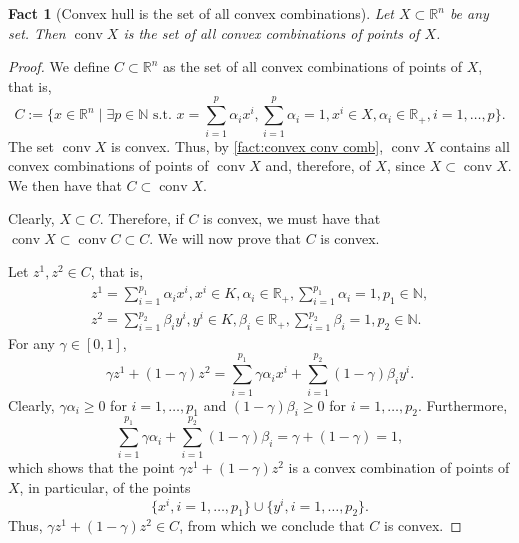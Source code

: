 \documentclass[smallextended,numbook,nospthms]{svjour3}
\theoremstyle{plain}
\newtheorem{fact}[theorem]{Fact}
\theoremstyle{definition}
\def\RR{\mathds R}
\def\NN{\mathds N}
\begin{document}
\begin{fact}[Convex hull is the set of all convex combinations]\label{fact:conv hull conv comb}
	Let $X \subset \RR^n$ be any set. Then $\operatorname{conv} X$ is the set of all convex combinations of points of $X$.
\end{fact}
\begin{proof}
	We define $C \subset \RR^n$ as the set of all convex combinations of points of $X$, that is,
	\[
	C:=\{x \in \RR^n \mid \exists p \in \NN \text{ s.t. } x=\sum_{i=1}^{p}\alpha_{i}x^{i}, \sum_{i=1}^{p} \alpha_{i}=1, x^{i} \in X, \alpha_{i}\in \RR_{+},i=1,\ldots,p\}.
	\]
	The set $\operatorname{conv} X$ is convex. Thus, by \cref{fact:convex conv comb}, $\operatorname{conv} X$ contains all convex combinations of points of $\operatorname{conv} X$ and, therefore, of $X$, since $X \subset \operatorname{conv} X$. We then have that $C \subset \operatorname{conv} X$.
	
	Clearly, $X \subset C$. Therefore, if $C$ is convex, we must have that $\operatorname{conv} X \subset \operatorname{conv} C \subset C$. We will now prove that $C$ is convex.
	
	Let $z^1,z^2 \in C$, that is,
	\begin{align}
		z^{1}=\sum_{i=1}^{p_{1}}\alpha_{i}x^{i}, x^i \in K, \alpha_{i} \in \RR_{+}, \sum_{i=1}^{p_{1}}\alpha_{i}=1, p_{1} \in \NN, \\
		z^{2}=\sum_{i=1}^{p_{2}}\beta_{i}y^{i}, y^i \in K, \beta_{i} \in \RR_{+}, \sum_{i=1}^{p_{2}}\beta_{i}=1, p_{2} \in \NN.
	\end{align}
	For any $\gamma \in [0,1]$,
	\[
	\gamma z^{1} + (1-\gamma)z^{2} = \sum_{i=1}^{p_{1}}\gamma \alpha_{i}x^{i} + \sum_{i=1}^{p_{2}}(1-\gamma) \beta_{i}y^{i}.
	\]
	Clearly, $\gamma \alpha_{i} \geq 0$ for $i=1,\ldots,p_{1}$ and $(1-\gamma)\beta_{i} \geq 0$ for $i=1,\ldots,p_{2}$. Furthermore,
	\[
	\sum_{i=1}^{p_{1}}\gamma \alpha_{i} + \sum_{i=1}^{p_{2}} (1-\gamma)\beta_{i} = \gamma + (1-\gamma)=1,
	\]
	which shows that the point $\gamma z^{1} + (1-\gamma)z^{2}$ is a convex combination of points of $X$, in particular, of the points
	\[
	\{x^{i},i=1,\ldots,p_{1}\}\cup\{y^{i},i=1,\ldots,p_{2}\}.
	\]
	Thus, $\gamma z^{1} + (1-\gamma)z^{2} \in C$, from which we conclude that $C$ is convex. 
\end{proof}
\end{document}
